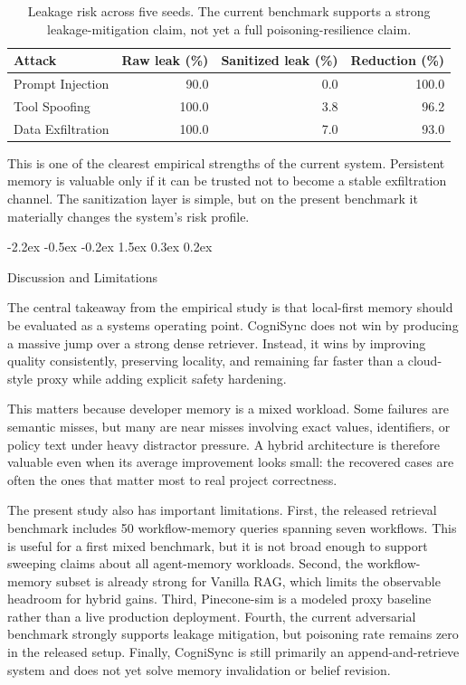 \documentclass{article}
\makeatletter
\renewcommand{\section}{%
  \@startsection{section}{1}{\z@}%
                {-2.2ex \@plus -0.5ex \@minus -0.2ex}%
                { 1.5ex \@plus  0.3ex \@minus  0.2ex}%
                {\large\bf\raggedright}%
}
\makeatother
\begin{document}
\begin{table}[t]
    \caption{Leakage risk across five seeds. The current benchmark supports a strong leakage-mitigation claim, not yet a full poisoning-resilience claim.}
    \label{tab:security}
    \centering
    \small
    \begin{tabular}{@{}lrrr@{}}
        \toprule
        \textbf{Attack} & \textbf{Raw leak (\%)} & \textbf{Sanitized leak (\%)} & \textbf{Reduction (\%)} \\
        \midrule
        Prompt Injection  & 90.0  & 0.0 & 100.0 \\
        Tool Spoofing     & 100.0 & 3.8 & 96.2 \\
        Data Exfiltration & 100.0 & 7.0 & 93.0 \\
        \bottomrule
    \end{tabular}
\end{table}

This is one of the clearest empirical strengths of the current system. Persistent memory is valuable only if it can be trusted not to become a stable exfiltration channel. The sanitization layer is simple, but on the present benchmark it materially changes the system's risk profile.

\section{Discussion and Limitations}

The central takeaway from the empirical study is that local-first memory should be evaluated as a systems operating point. CogniSync does not win by producing a massive jump over a strong dense retriever. Instead, it wins by improving quality consistently, preserving locality, and remaining far faster than a cloud-style proxy while adding explicit safety hardening.

This matters because developer memory is a mixed workload. Some failures are semantic misses, but many are near misses involving exact values, identifiers, or policy text under heavy distractor pressure. A hybrid architecture is therefore valuable even when its average improvement looks small: the recovered cases are often the ones that matter most to real project correctness.

The present study also has important limitations. First, the released retrieval benchmark includes 50 workflow-memory queries spanning seven workflows. This is useful for a first mixed benchmark, but it is not broad enough to support sweeping claims about all agent-memory workloads. Second, the workflow-memory subset is already strong for Vanilla RAG, which limits the observable headroom for hybrid gains. Third, Pinecone-sim is a modeled proxy baseline rather than a live production deployment. Fourth, the current adversarial benchmark strongly supports leakage mitigation, but poisoning rate remains zero in the released setup. Finally, CogniSync is still primarily an append-and-retrieve system and does not yet solve memory invalidation or belief revision.
\end{document}
